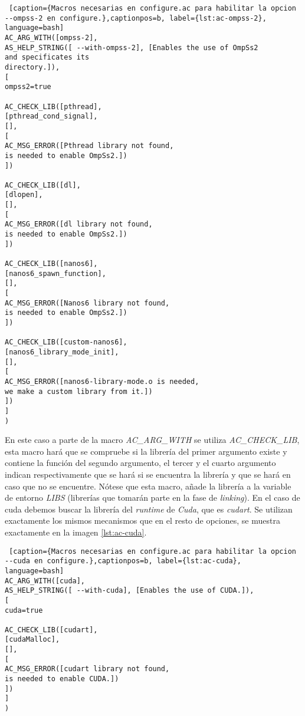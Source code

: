 \begin{minipage}{\linewidth}
\begin{lstlisting} [caption={Macros necesarias en configure.ac para habilitar la opcion --ompss-2 en configure.},captionpos=b, label={lst:ac-ompss-2}, language=bash]
AC_ARG_WITH([ompss-2],
AS_HELP_STRING([ --with-ompss-2], [Enables the use of OmpSs2 
and specificates its 
directory.]),
[
ompss2=true

AC_CHECK_LIB([pthread], 
[pthread_cond_signal], 
[],
[
AC_MSG_ERROR([Pthread library not found, 
is needed to enable OmpSs2.])
])

AC_CHECK_LIB([dl], 
[dlopen], 
[],
[
AC_MSG_ERROR([dl library not found, 
is needed to enable OmpSs2.])
])

AC_CHECK_LIB([nanos6], 
[nanos6_spawn_function], 
[],
[
AC_MSG_ERROR([Nanos6 library not found, 
is needed to enable OmpSs2.])
])

AC_CHECK_LIB([custom-nanos6], 
[nanos6_library_mode_init], 
[],
[
AC_MSG_ERROR([nanos6-library-mode.o is needed, 
we make a custom library from it.])
])
]
)
\end{lstlisting}
\end{minipage}

\bigskip

En este caso a parte de la macro \textit{AC\_ARG\_WITH} se utiliza \textit{AC\_CHECK\_LIB}, esta macro hará que se compruebe si la librería del primer argumento existe y contiene la función del segundo argumento, el tercer y el cuarto argumento indican respectivamente que se hará si se encuentra la librería y que se hará en caso que no se encuentre. Nótese que esta macro, añade la librería a la variable de entorno \textit{LIBS} (librerías que tomarán parte en la fase de \textit{linking}). En el caso de cuda debemos buscar la librería del \textit{runtime} de \textit{Cuda}, que es \textit{cudart}. Se utilizan exactamente los mismos mecanismos que en el resto de opciones, se muestra exactamente en la imagen \ref{lst:ac-cuda}.

\bigskip

\begin{minipage}{\linewidth}
\begin{lstlisting} [caption={Macros necesarias en configure.ac para habilitar la opcion --cuda en configure.},captionpos=b, label={lst:ac-cuda}, language=bash]
AC_ARG_WITH([cuda],
AS_HELP_STRING([ --with-cuda], [Enables the use of CUDA.]),
[
cuda=true

AC_CHECK_LIB([cudart], 
[cudaMalloc], 
[],
[
AC_MSG_ERROR([cudart library not found, 
is needed to enable CUDA.])
])
]
)
\end{lstlisting}
\end{minipage}


